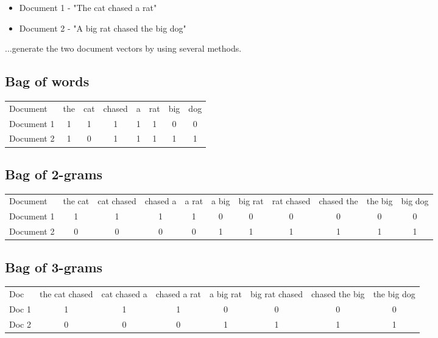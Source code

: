 \documentclass{article}
\begin{document}
\begin{itemize}
    \item Document 1 - "The cat chased a rat"
    \item Document 2 - "A big rat chased the big dog"
\end{itemize}

\noindent ...generate the two document vectors by using several methods.

\subsection*{Bag of words}

\begin{center}
    \begin{tabular}{ l c c c c c c c }
        Document & the & cat & chased & a & rat & big & dog \\
        Document 1 & 1 & 1 & 1 & 1 & 1 & 0 & 0 \\
        Document 2 & 1 & 0 & 1 & 1 & 1 & 1 & 1 
    \end{tabular}
\end{center}

\subsection*{Bag of 2-grams}

\begin{center}
    \begin{tabular}{ l c c c c c c c c c c }
        Document & the cat & cat chased & chased a & a rat & a big & big rat & rat chased & chased the & the big & big dog \\
        Document 1 & 1 & 1 & 1 & 1 & 0 & 0 & 0 & 0 & 0 & 0 \\
        Document 2 & 0 & 0 & 0 & 0 & 1 & 1 & 1 & 1 & 1 & 1\\ 
    \end{tabular}
\end{center}

\subsection*{Bag of 3-grams}

\begin{center}
    \begin{tabular}{ l c c c c c c c }
        Doc & the cat chased & cat chased a & chased a rat & a big rat & big rat chased & chased the big & the big dog\\
        Doc 1 & 1 & 1 & 1 & 0 & 0 & 0 & 0\\
        Doc 2 & 0 & 0 & 0 & 1 & 1 & 1 & 1\\
    \end{tabular}
\end{center}
\end{document}
